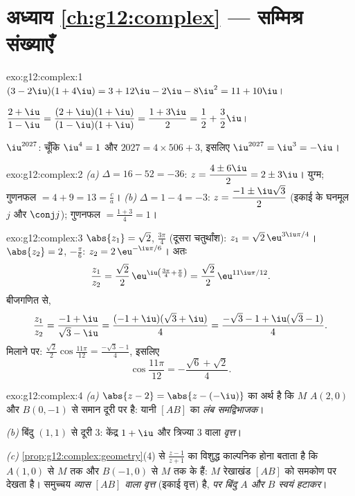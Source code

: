 \section*{अध्याय \ref{ch:g12:complex} --- सम्मिश्र संख्याएँ}

\begin{solution}{exo:g12:complex:1}
$(3-2\iu)(1+4\iu) = 3 + 12\iu - 2\iu - 8\iu^2 = 11 + 10\iu$।

$\dfrac{2+\iu}{1-\iu} = \dfrac{(2+\iu)(1+\iu)}{(1-\iu)(1+\iu)}
= \dfrac{1 + 3\iu}{2} = \dfrac12 + \dfrac32\iu$।

$\iu^{2027}$: चूँकि $\iu^4 = 1$ और $2027 = 4 \times 506 + 3$, इसलिए $\iu^{2027} = \iu^3 = -\iu$।
\end{solution}

\begin{solution}{exo:g12:complex:2}
\emph{(a)} $\Delta = 16 - 52 = -36$: $z = \dfrac{4 \pm 6\iu}{2} = 2 \pm 3\iu$।  युग्म; गुणनफल $= 4 + 9 = 13 = \frac ca$। \emph{(b)} $\Delta = 1 - 4 = -3$: $z = \dfrac{-1 \pm \iu\sqrt3}{2}$
(इकाई के घनमूल $j$ और $\conj j$); गुणनफल $= \frac{1 + 3}{4} = 1$।
\end{solution}

\begin{solution}{exo:g12:complex:3}
$\abs{z_1} = \sqrt2$,  $\frac{3\pi}{4}$ (दूसरा चतुर्थांश): $z_1 = \sqrt2\,\eu^{3\iu\pi/4}$। $\abs{z_2} = 2$,  $-\frac\pi6$: $z_2 = 2\,\eu^{-\iu\pi/6}$। अतः
\[
\frac{z_1}{z_2} = \frac{\sqrt2}{2}\,\eu^{\iu\left(\frac{3\pi}{4} + \frac{\pi}{6}\right)}
= \frac{\sqrt2}{2}\,\eu^{11\iu\pi/12}.
\]
बीजगणित से,
\[
\frac{z_1}{z_2} = \frac{-1+\iu}{\sqrt3 - \iu}
= \frac{(-1+\iu)(\sqrt3+\iu)}{4}
= \frac{-\sqrt3 - 1 + \iu(\sqrt3 - 1)}{4}.
\]
 मिलाने पर: $\frac{\sqrt2}{2}\cos\frac{11\pi}{12} = \frac{-\sqrt3-1}{4}$, इसलिए
\[
\cos\frac{11\pi}{12} = -\frac{\sqrt6 + \sqrt2}{4}.
\]
\end{solution}

\begin{solution}{exo:g12:complex:4}
\emph{(a)} $\abs{z - 2} = \abs{z - (-\iu)}$ का अर्थ है कि $M$ $A(2, 0)$ और $B(0, -1)$ से समान दूरी पर है: यानी $[AB]$
का \emph{लंब समद्विभाजक}।

\emph{(b)} बिंदु $(1,1)$ से दूरी $3$: केंद्र $1 + \iu$ और त्रिज्या $3$ वाला
\emph{वृत्त}।

\emph{(c)} \cref{prop:g12:complex:geometry}(4) से $\frac{z-1}{z+1}$ का विशुद्ध काल्पनिक होना बताता है कि $A(1,0)$ से $M$
तक और $B(-1,0)$ से $M$ तक के   हैं: $M$ रेखाखंड $[AB]$ को समकोण पर देखता
है। समुच्चय \emph{व्यास $[AB]$ वाला वृत्त} (इकाई वृत्त) है, \emph{पर बिंदु $A$
और $B$ स्वयं हटाकर}।
\end{solution}


